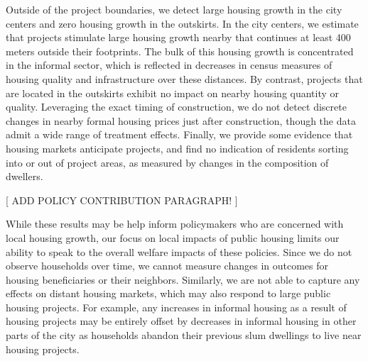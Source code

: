 \documentclass[12pt]{article}
\begin{document}

Outside of the project boundaries, we detect large housing growth in the city centers and zero housing growth in the outskirts.  In the city centers, we estimate that projects stimulate large housing growth nearby that continues at least 400 meters outside their footprints.  The bulk of this housing growth is concentrated in the informal sector, which is reflected in decreases in census measures of housing quality and infrastructure over these distances.  By contrast, projects that are located in the outskirts exhibit no impact on nearby housing quantity or quality.  Leveraging the exact timing of construction, we do not detect discrete changes in nearby formal housing prices just after construction, though the data admit a wide range of treatment effects. Finally, we provide some evidence that housing markets anticipate projects, and find no indication of residents sorting into or out of project areas, as measured by changes in the composition of dwellers. 


[ ADD POLICY CONTRIBUTION PARAGRAPH! ]
 

While these results may be help inform policymakers who are concerned with local housing growth, our focus on local impacts of public housing limits our ability to speak to the overall welfare impacts of these policies.  Since we do not observe  households over time, we cannot measure changes in outcomes for housing beneficiaries or their neighbors.  Similarly, we are not able to capture any effects on distant housing markets, which may also respond to large public housing projects.  For example, any increases in informal housing as a result of housing projects may be entirely offset by decreases in informal housing in other parts of the city as households abandon their previous slum dwellings to live near housing projects.
\end{document}
